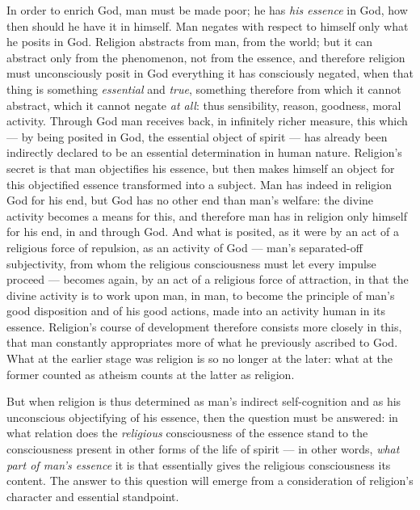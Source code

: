 \documentclass[12pt,a4paper]{book}
\begin{document}
In order to enrich God, man must be made poor; he has \emph{his essence} in
God, how then should he have it in himself. Man negates with respect to
himself only what he posits in God. Religion abstracts from man, from the
world; but it can abstract only from the phenomenon, not from the essence, and
therefore religion must unconsciously posit in God everything it has
consciously negated, when that thing is something \emph{essential} and
\emph{true}, something therefore from which it cannot abstract, which it
cannot negate \emph{at all}: thus sensibility, reason, goodness, moral
activity.
Through God man receives back, in infinitely richer measure, this which --- by
being posited in God, the essential object of spirit --- has already been
indirectly declared to be an essential determination in human nature.
Religion's secret is that man objectifies his essence, but then makes himself
an object for this objectified essence transformed into a subject. Man has
indeed in religion God for his end, but God has no other end than man's
welfare: the divine activity becomes a means for this, and therefore man has
in religion only himself for his end, in and through God. And what is posited,
as it were by an act of a religious force of repulsion, as an activity of God
--- man's separated-off subjectivity, from whom the religious consciousness
must let every impulse proceed --- becomes again, by an act of a religious
force of attraction, in that the divine activity is to work upon man, in man,
to become the principle of man's good disposition and of his good actions,
made into an activity human in its essence. Religion's course of development
therefore consists more closely in this, that man constantly appropriates more
of what he previously ascribed to God. What at the earlier stage was
religion is so no longer at the later: what at the former counted as atheism
counts at the latter as religion.

But when religion is thus determined as man's indirect self-cognition and as
his unconscious objectifying of his essence, then the question must be
answered: in what relation does the \emph{religious} consciousness of the
essence stand to the consciousness present in other forms of the life of
spirit --- in other words, \emph{what part of man's essence} it is that
essentially gives the religious consciousness its content.
The answer to this question will emerge from a consideration of religion's
character and essential standpoint.
\end{document}
